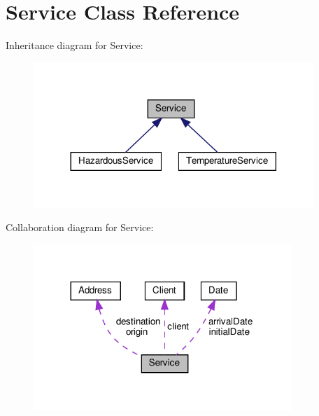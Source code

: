 \hypertarget{class_service}{}\section{Service Class Reference}
\label{class_service}


Inheritance diagram for Service\+:\nopagebreak
\begin{figure}[H]
\begin{center}
\leavevmode
\includegraphics[width=300pt]{class_service__inherit__graph}
\end{center}
\end{figure}


Collaboration diagram for Service\+:\nopagebreak
\begin{figure}[H]
\begin{center}
\leavevmode
\includegraphics[width=276pt]{class_service__coll__graph}
\end{center}
\end{figure}
